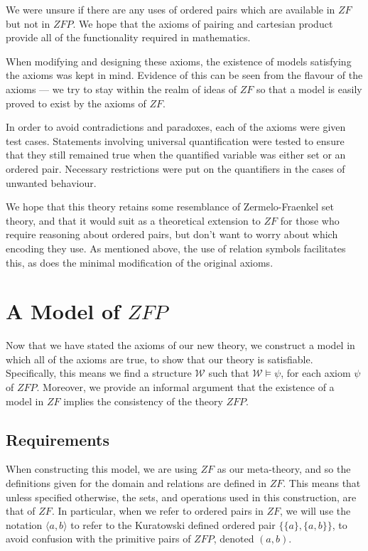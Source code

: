 \documentclass[11pt]{report}
\newcommand{\pair}[2]{\langle #1,#2 \rangle}
\theoremstyle{definition}
\theoremstyle{theorem}
\theoremstyle{lemma}
\begin{document}
We were unsure if there are any uses of ordered pairs which are available in $\mathit{ZF}$ but not in $\mathit{ZFP}$. 
We hope that the axioms of pairing and cartesian product provide all of the functionality required in mathematics. 

When modifying and designing these axioms, the existence of models satisfying the axioms was kept in mind. 
Evidence of this can be seen from the flavour of the axioms --- we try to stay within the realm of ideas of $\mathit{ZF}$ so that a model is easily proved to exist by the axioms of $\mathit{ZF}$. 

In order to avoid contradictions and paradoxes, each of the axioms were given test cases.
Statements involving universal quantification were tested to ensure that they still remained true when the quantified variable was either set or an ordered pair.
Necessary restrictions were put on the quantifiers in the cases of unwanted behaviour. 

We hope that this theory retains some resemblance of Zermelo-Fraenkel set theory, and that it would suit as a theoretical extension to $\mathit{ZF}$ for those who require reasoning about ordered pairs, but don't want to worry about which encoding they use. 
As mentioned above, the use of relation symbols facilitates this, as does the minimal modification of the original axioms. 

\section{A Model of $\mathit{ZFP}$}
Now that we have stated the axioms of our new theory, we construct a model in which all of the axioms are true, to show that our theory is satisfiable.
Specifically, this means we find a structure $\mathcal{W}$ such that $\mathcal{W} \vDash \psi$, for each axiom $\psi$ of $\mathit{ZFP}$.
Moreover, we provide an informal argument that the existence of a model in $\mathit{ZF}$ implies the consistency of the theory $\mathit{ZFP}$. 

\subsection{Requirements}
When constructing this model, we are using $\mathit{ZF}$ as our meta-theory, and so the definitions given for the domain and relations are defined in $\mathit{ZF}$.
This means that unless specified otherwise, the sets, and operations used in this construction, are that of $\mathit{ZF}$.
In particular, when we refer to ordered pairs in $\mathit{ZF}$, we will use the notation $\pair{a}{b}$ to refer to the Kuratowski defined ordered pair $\{\{a\}, \{a,b\}\}$, to avoid confusion with the primitive pairs of $\mathit{ZFP}$, denoted $(a,b)$.
\end{document}
